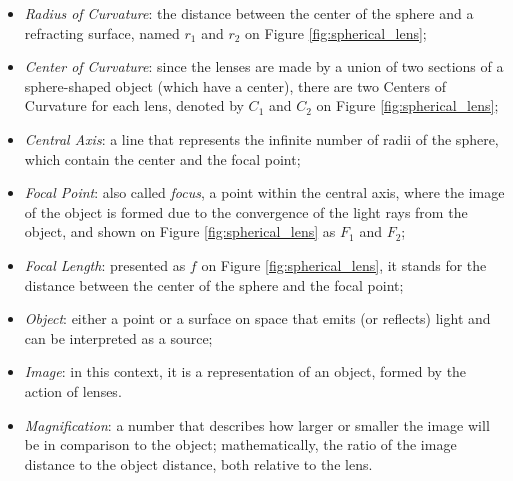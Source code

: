 \begin{itemize}
    \item \emph{Radius of Curvature}: the distance between the center of the sphere and a refracting surface, named $\mathit{r_{1}}$ and $\mathit{r_{2}}$ on Figure \ref{fig:spherical_lens};
    
    \item \emph{Center of Curvature}: since the lenses are made by a union of two sections of a sphere-shaped object (which have a center), there are two Centers of Curvature for each lens, denoted by $\mathit{C_{1}}$ and $\mathit{C_{2}}$ on Figure \ref{fig:spherical_lens};
    
    \item \emph{Central Axis}: a line that represents the infinite number of radii of the sphere, which contain the center and the focal point;
    
    \item \emph{Focal Point}: also called \emph{focus}, a point within the central axis, where the image of the object is formed due to the convergence of the light rays from the object, and shown on Figure \ref{fig:spherical_lens} as $\mathit{F_{1}}$ and $\mathit{F_{2}}$;
    
    \item \emph{Focal Length}: presented as $\mathit{f}$ on Figure \ref{fig:spherical_lens}, it stands for the distance between the center of the sphere and the focal point;
    
    \item \emph{Object}: either a point or a surface on space that emits (or reflects) light and can be interpreted as a source;
    
    \item \emph{Image}: in this context, it is a representation of an object, formed by the action of lenses.
    
    \item \emph{Magnification}: a number that describes how larger or smaller the image will be in comparison to the object; mathematically, the ratio of the image distance to the object distance, both relative to the lens.
    
\end{itemize}

